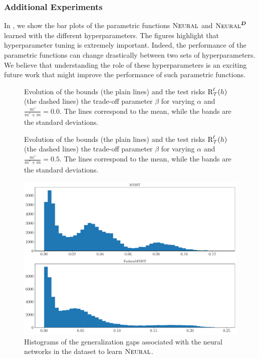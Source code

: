 \documentclass[twoside]{article}
\theoremstyle{plain}
\begin{document}
\subsubsection{Additional Experiments}
\label{sec:additional-experiments-neural-comp-experiments}

In , we show the bar plots of the parametric functions $\text{\sc Neural}$ and $\text{\sc Neural}^{\boldsymbol{D}}$ learned with the different hyperparameters.
The figures highlight that hyperparameter tuning is extremely important.
Indeed, the performance of the parametric functions can change drastically between two sets of hyperparameters.
We believe that understanding the role of these hyperparameters is an exciting future work that might improve the performance of such parametric functions.

\newpage

\begin{figure}
    \centering
    
    \caption{
    Evolution of the bounds (the plain lines) and the test risks $\text{R}^{\ell}_{\mathcal{T}}(h)$ (the dashed lines) \wrt the trade-off parameter $\beta$ for varying $\alpha$ and $\frac{m'}{m'+m}=0.0$.
    The lines correspond to the mean, while the bands are the standard deviations.
    }
    \label{fig:reg-risk-alpha}
\end{figure}

\begin{figure}
    \centering
    
    \caption{
    Evolution of the bounds (the plain lines) and the test risks $\text{R}^{\ell}_{\mathcal{T}}(h)$ (the dashed lines) \wrt the trade-off parameter $\beta$ for varying $\alpha$ and $\frac{m'}{m'+m}=0.5$.
    The lines correspond to the mean, while the bands are the standard deviations.
    }
    \label{fig:reg-risk-alpha-prior}
\end{figure}

\begin{figure}
\centering
\includegraphics[width=1.0\linewidth]{figures/fig_6.pdf}
\caption{
Histograms of the generalization gaps associated with the neural networks in the dataset to learn $\text{\sc Neural}$. 
}
\label{fig:hist}
\end{figure}
\end{document}
